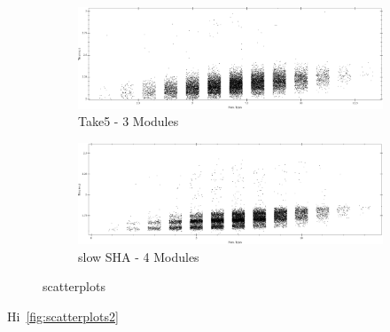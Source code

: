 \begin{figure}[t]
  \begin{subfigure}{\textwidth}
    \centering\includegraphics[width=\textwidth]{figures/Take5.png}
  \caption*{Take5 - 3 Modules}
\end{subfigure}

\begin{subfigure}{\textwidth}
  \centering\includegraphics[width=\textwidth]{figures/slowSHA.png}
  \caption*{slow SHA - 4 Modules}
\end{subfigure}

\caption{scatterplots}
\label{fig:scatterplots}
\end{figure}
Hi~\ref{fig:scatterplots2}

